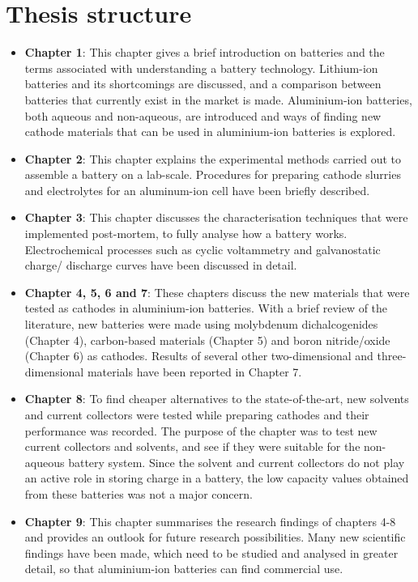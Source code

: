 \section*{\centering Thesis structure}
\begin{itemize}
    \item \textbf{Chapter 1}: This chapter gives a brief introduction on batteries and the terms associated with understanding a battery technology. Lithium-ion batteries and its shortcomings are discussed, and a comparison between batteries that currently exist in the market is made. Aluminium-ion batteries, both aqueous and non-aqueous, are introduced and ways of finding new cathode materials that can be used in aluminium-ion batteries is explored.
    \item \textbf{Chapter 2}: This chapter explains the experimental methods carried out to assemble a battery on a lab-scale. Procedures for preparing cathode slurries and electrolytes for an aluminum-ion cell have been briefly described.  
    \item \textbf{Chapter 3}: This chapter discusses the characterisation techniques that were implemented post-mortem, to fully analyse how a battery works. Electrochemical processes such as cyclic voltammetry and galvanostatic charge/ discharge curves have been discussed in detail.   
    \item \textbf{Chapter 4, 5, 6 and 7}: These chapters discuss the new materials that were tested as cathodes in aluminium-ion batteries. With a brief review of the literature, new batteries were made using molybdenum dichalcogenides (Chapter 4), carbon-based materials (Chapter 5) and boron nitride/oxide (Chapter 6) as cathodes. Results of several other two-dimensional and three-dimensional materials have been reported in Chapter 7. 
    \item \textbf{Chapter 8}: To find cheaper alternatives to the state-of-the-art, new solvents and current collectors were tested while preparing cathodes and their performance was recorded. The purpose of the chapter was to test new current collectors and solvents, and see if they were suitable for the non-aqueous battery system. Since the solvent and current collectors do not play an active role in storing charge in a battery, the low capacity values obtained from these batteries was not a major concern.    
    \item \textbf{Chapter 9}: This chapter summarises the research findings of chapters 4-8 and provides an outlook for future research possibilities. Many new scientific findings have been made, which need to be studied and analysed in greater detail, so that aluminium-ion batteries can find commercial use.
    \end{itemize}
